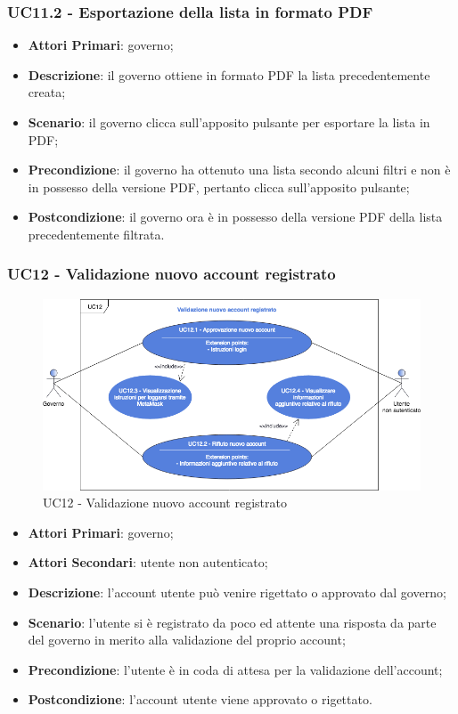 \subsubsection{UC11.2 - Esportazione della lista in formato PDF}
\begin{itemize}
	\item \textbf{Attori Primari}: governo;
	\item \textbf{Descrizione}: il governo ottiene in formato PDF la lista precedentemente creata;
	\item \textbf{Scenario}: il governo clicca sull'apposito pulsante per esportare la lista in PDF;
	\item \textbf{Precondizione}: il governo ha ottenuto una lista secondo alcuni filtri e non è in possesso della versione PDF, pertanto clicca sull'apposito pulsante;
	\item \textbf{Postcondizione}: il governo ora è in possesso della versione PDF della lista precedentemente filtrata.
\end{itemize}
\subsubsection{UC12 - Validazione nuovo account registrato}
\begin{figure}[h]
	\includegraphics[width=15.5cm]{res/images/UC12Validazione.png} %
	\centering
	\caption{UC12 - Validazione nuovo account registrato}
	
\end{figure}
\begin{itemize}
	\item \textbf{Attori Primari}:
	governo;
	\item \textbf{Attori Secondari}:
	utente non autenticato;
	\item \textbf{Descrizione}: l'account utente può venire rigettato o approvato dal governo;
	\item \textbf{Scenario}: l'utente si è registrato da poco ed attente una risposta da parte del governo in merito alla validazione del proprio account;
	\item \textbf{Precondizione}: l'utente è in coda di attesa per la validazione dell'account;
	\item \textbf{Postcondizione}: l'account utente viene approvato o rigettato. 
\end{itemize}
